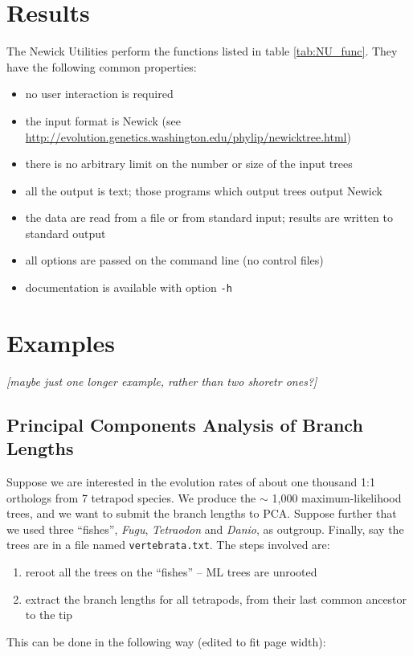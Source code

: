 \documentclass{bioinfo}
\newcommand{\nutils}{Newick Utilities}
\begin{document}
\section{Results}

The \nutils{} perform the functions listed in table \ref{tab:NU_func}. They have the following common properties:

\begin{itemize}
 \item no user interaction is required
 \item the input format is Newick (see \url{http://evolution.genetics.washington.edu/phylip/newicktree.html})
 \item there is no arbitrary limit on the number or size of the input trees
 \item all the output is text; those programs which output trees output Newick
 \item the data are read from a file or from standard input; results are written to standard output
 \item all options are passed on the command line (no control files)
 \item documentation is available with option \texttt{-h}
\end{itemize}

\section*{Examples}

\emph{[maybe just one longer example, rather than two shoretr ones?]}

\subsection*{Principal Components Analysis of Branch Lengths}

Suppose we are interested in the evolution rates of about one thousand 1:1 orthologs from 7 tetrapod species. We produce the $\sim$ 1,000 maximum-likelihood trees, and we want to submit the branch lengths to \textsc{PCA}. Suppose further that we used three ``fishes'', \textit{Fugu}, \textit{Tetraodon} and \textit{Danio}, as outgroup. Finally, say the trees are in a file named \texttt{vertebrata.txt}. The steps involved are:
\begin{enumerate}
 \item reroot all the trees on the ``fishes'' -- ML trees are unrooted
 \item extract the branch lengths for all tetrapods, from their last common ancestor to the tip
\end{enumerate}
This can be done in the following way (edited to fit page width):
\end{document}
